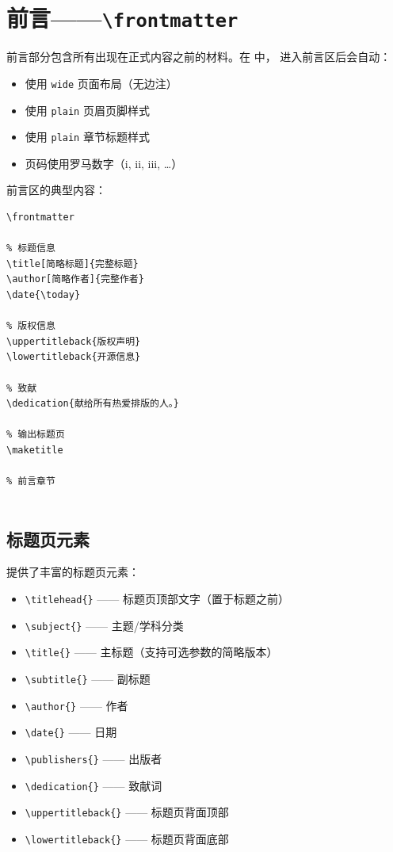 
\section{前言——\texttt{\textbackslash frontmatter}}


前言部分包含所有出现在正式内容之前的材料。在  中，
进入前言区后会自动：
\begin{itemize}
    \item 使用 \texttt{wide} 页面布局（无边注）
    \item 使用 \texttt{plain} 页眉页脚样式
    \item 使用 \texttt{plain} 章节标题样式
    \item 页码使用罗马数字（i, ii, iii, \ldots{}）
\end{itemize}

前言区的典型内容：

\begin{lstlisting}
\frontmatter

% 标题信息
\title[简略标题]{完整标题}
\author[简略作者]{完整作者}
\date{\today}

% 版权信息
\uppertitleback{版权声明}
\lowertitleback{开源信息}

% 致献
\dedication{献给所有热爱排版的人。}

% 输出标题页
\maketitle

% 前言章节


\end{lstlisting}

\subsection{标题页元素}

 提供了丰富的标题页元素：

\begin{itemize}
    \item \lstinline|\titlehead{}| —— 标题页顶部文字（置于标题之前）
    \item \lstinline|\subject{}| —— 主题/学科分类
    \item \lstinline|\title{}| —— 主标题（支持可选参数的简略版本）
    \item \lstinline|\subtitle{}| —— 副标题
    \item \lstinline|\author{}| —— 作者
    \item \lstinline|\date{}| —— 日期
    \item \lstinline|\publishers{}| —— 出版者
    \item \lstinline|\dedication{}| —— 致献词
    \item \lstinline|\uppertitleback{}| —— 标题页背面顶部
    \item \lstinline|\lowertitleback{}| —— 标题页背面底部
\end{itemize}

